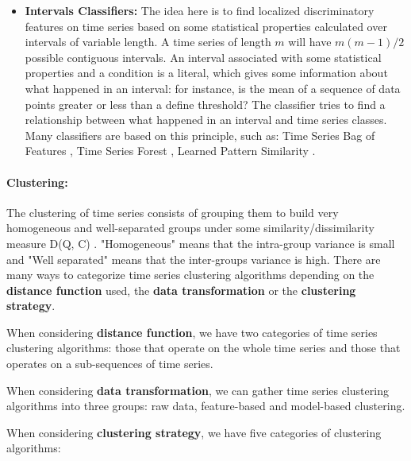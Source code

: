 \begin{itemize}
\item \textbf{Intervals Classifiers:} The idea here is to find localized discriminatory features on time series based on some statistical properties calculated over intervals of variable length. A time series of length $m$ will have $ m(m-1)/2$ possible contiguous intervals. An interval associated with some statistical properties and a condition is a literal, which gives some information about what happened in an interval: for instance, is the mean of a sequence of data points greater or less than a define threshold? The classifier tries to find a relationship between what happened in an interval and  time series classes. Many classifiers are based on this principle, such as: Time Series Bag of Features  \cite{baydogan2013bag}, Time Series Forest  \cite{deng2013time}, Learned Pattern Similarity  \cite{baydogan2016time}.
\end{itemize}


\paragraph{Clustering:}
The clustering of time series consists of grouping them to build very homogeneous and well-separated groups under some similarity/dissimilarity measure D(Q, C) \cite{rani2012recent}. "Homogeneous" means that the intra-group variance is small and "Well separated" means that the inter-groups variance is high. There are many ways to categorize time series clustering algorithms depending on the \textbf{distance function} used, the \textbf{data transformation} or  the \textbf{clustering strategy}. 


When considering \textbf{distance function}, we have two categories of time series clustering algorithms: those that operate on the whole time series and those that operates on a sub-sequences of time series.


 When considering \textbf{data transformation}, we can  gather time series clustering algorithms into three groups:  raw data, feature-based and model-based clustering. 


When considering \textbf{clustering strategy}, we have five categories of clustering algorithms: 

